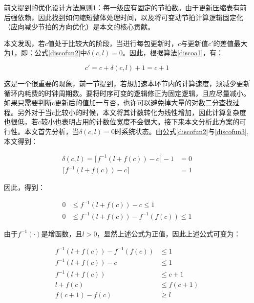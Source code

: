前文提到的优化设计方法原则1：每一级应有固定的节拍数。由于更新压缩表有前后强依赖，因此找到如何缩短整体处理时间，以及将可变动节拍计算逻辑固定化（应向减少节拍的方向优化）是本文的核心贡献。

本文发现，若$ c $值处于比较大的阶段，当进行每包更新时，$ c $与更新值$ c' $的差值最大为1，即：公式\ref{discofun2}中$ \delta(c,l)=0$。因此，根据算法\ref{discoa1}，有：

\begin{equation} \label{mydiscof1}
c'=c+\delta(c,l) + 1 =c+1
\end{equation}

这是一个很重要的现象，前一节提到，若想加速本环节内的计算速度，须减少更新循环内耗费的时钟周期数。要将时序可变的逻辑修正为固定逻辑，且应尽量减小。如果只需要判断c更新后的值加一与否，也许可以避免掉大量的对数二分查找过程。另外对于当c比较小的时候，本文将其计数转化为线性增加，因此计算复杂度也很低，若c较小也表明占用的计数位宽度不会很大。接下来本文分析此方案的可行性。本文首先分析，当$ \delta(c,l)=0$时系统状态。由公式\ref{discofun2}与\ref{discofun3},本文得到：

\begin{align}
\delta(c,l) =  \lceil f^{-1}(l+f(c)) - c \rceil -1 &= 0 \nonumber \\
\lceil f^{-1}(l+f(c)) - c \rceil &= 1 %
\end{align}

因此，得到：


\begin{align}
0 &\leq f^{-1}(l+f(c)) - c \leq 1 \nonumber  \\
0 &\leq f^{-1}(l+f(c)) - f^{-1}(f(c)) \leq 1
\end{align}

%

由于$f^{-1}(\cdot)$是增函数，且$l>0$，显然上述公式为正值，因此上述公式可变为：


\begin{align}\label{mydiscof2}
f^{-1}(l+f(c)) - f^{-1}(f(c)) &\leq 1 \nonumber  \\
f^{-1}(l+f(c)) - c &\leq 1 \nonumber  \\
f^{-1}(l+f(c))  &\leq c + 1  \nonumber \\
l+f(c) &\leq f(c+1) \nonumber  \\
f(c+1) - f(c) &\geq l
\end{align}

